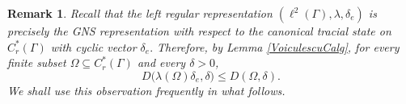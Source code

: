 \documentclass[a4paper,11pt,reqno]{amsart}
\theoremstyle{plain}
\newtheorem{rem}[thm]{Remark}
\theoremstyle{mainthmstyle}
\theoremstyle{named}
\numberwithin{equation}{section}
\begin{document}
\begin{rem}
Recall that the left regular representation $(\ell^2(\Gamma),\lambda,\delta_e)$ is precisely the GNS representation with respect to the canonical tracial state on $C_r^*(\Gamma)$ with cyclic vector $\delta_e.$ Therefore, by Lemma \ref{VoiculescuCalg}, for every finite subset $\Omega \subseteq C_r^*(\Gamma)$ and every $\delta>0$,
\[
D\bigl(\lambda(\Omega)\delta_e,\delta\bigr)\leq D(\Omega,\delta).
\]
We shall use this observation frequently in what follows.
\end{rem}
\end{document}
